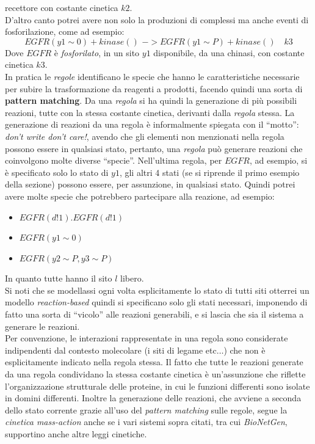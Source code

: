 \documentclass[a4paper,12pt, oneside]{book}
\begin{document}
recettore con costante cinetica $k2$. \\
D'altro canto potrei avere non solo la produzioni di complessi ma anche eventi
di fosforilazione, come ad esempio:
\[EGFR(y1\sim 0) + kinase()\,\, -> EGFR(y1\sim P) + kinase()\quad k3\]
Dove $EGFR$ è \textit{fosforilato}, in un sito $y1$ disponibile, da una chinasi,
con costante cinetica $k3$.\\
In pratica le \textit{regole} identificano le specie che hanno le
caratteristiche necessarie per subire la trasformazione da reagenti a prodotti,
facendo quindi una sorta di \textbf{pattern matching}. Da una \textit{regola} si
ha quindi la generazione di più possibili reazioni, tutte con la stessa costante
cinetica, derivanti dalla \textit{regola} stessa. La generazione di reazioni da
una regola è informalmente spiegata con il ``motto'': \textit{don't write don't
  care!}, avendo che gli elementi non menzionati nella regola possono essere in
qualsiasi stato, pertanto, una \textit{regola} può generare reazioni che
coinvolgono 
molte diverse ``specie''. Nell'ultima regola, per $EGFR$, ad esempio, si è
specificato 
solo lo stato di $y1$, gli altri 4 stati (se si riprende il primo esempio della
sezione) possono essere, per assunzione, in qualsiasi stato. Quindi potrei avere
molte specie che potrebbero partecipare alla reazione, ad esempio:
\begin{itemize}
  \item $EGFR(d!1).EGFR(d!1)$
  \item $EGFR(y1\sim 0)$
  \item $EGFR(y2\sim P, y3\sim P)$
\end{itemize}
In quanto tutte hanno il sito $l$ libero.\\
Si noti che se modellassi ogni volta esplicitamente lo stato di tutti siti
otterrei un modello \textit{reaction-based} quindi si specificano solo gli stati
necessari, imponendo di fatto una sorta di ``vicolo'' alle reazioni generabili,
e si lascia che sia il sistema a generare le reazioni.  \\
Per convenzione, le interazioni rappresentate in una regola sono considerate
indipendenti dal contesto molecolare (i siti di legame etc$\ldots$) che non è
esplicitamente indicato nella regola stessa. Il fatto che tutte le reazioni
generate da una regola condividano la stessa costante cinetica è un'assunzione
che riflette l'organizzazione strutturale delle proteine, in cui le funzioni
differenti sono isolate in domini differenti. Inoltre la generazione delle
reazioni, che avviene a seconda dello stato corrente grazie all'uso del
\textit{pattern matching} sulle regole, segue la \textit{cinetica mass-action}
anche se i vari sistemi sopra 
citati, tra cui \textit{BioNetGen}, supportino anche altre leggi cinetiche.
\end{document}

